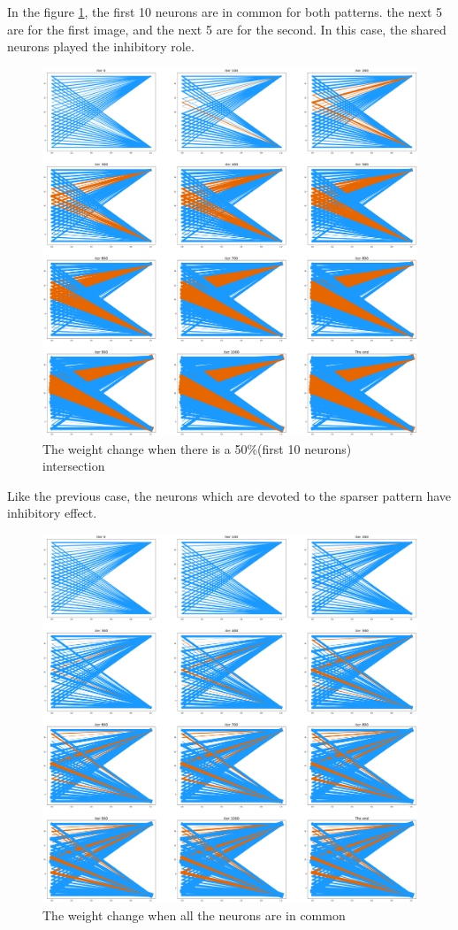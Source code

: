 \documentclass{article}
\begin{document}
	In the figure \ref{fig:w50}, the first 10 neurons are in common for both patterns. the next 5 are for the first image, and the next 5 are for the second. In this case, the shared neurons played the inhibitory role. 
	\begin{figure}
		\includegraphics[width=\textwidth]{weight_change50.png}
		\caption{The weight change when there is a 50\%(first 10 neurons) intersection}
		\label{fig:w50}
	\end{figure}
	
	Like the previous case, the neurons which are devoted to the sparser pattern have inhibitory effect.
	
	\begin{figure}
		\includegraphics[width=\textwidth]{weight_change100.png}
		\caption{The weight change when all the neurons are in common}
		\label{fig:w100}
	\end{figure}
	
\end{document}
